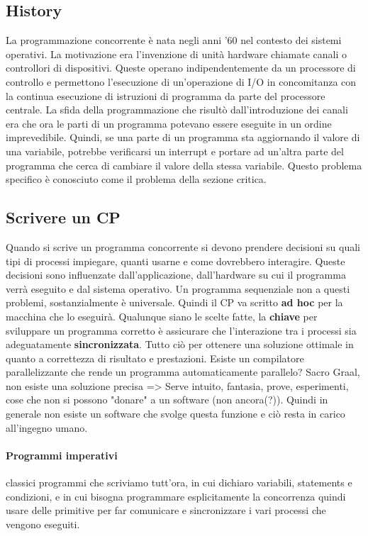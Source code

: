 \documentclass[10pt,a4paper]{book}
\begin{document}
\subsection{History}
La programmazione concorrente è nata negli anni '60 nel contesto dei sistemi operativi. La motivazione era l'invenzione di unità hardware chiamate canali o controllori di dispositivi. Queste operano indipendentemente da un processore di controllo e permettono l'esecuzione di un'operazione di I/O in concomitanza con la continua esecuzione di istruzioni di programma da parte del processore centrale.
La sfida della programmazione che risultò dall'introduzione dei canali era che ora le parti di un programma potevano essere eseguite in un ordine imprevedibile. Quindi, se una parte di un programma sta aggiornando il valore di una variabile, potrebbe verificarsi un interrupt e portare ad un'altra parte del programma che cerca di cambiare il valore della stessa variabile. Questo problema specifico è conosciuto come il problema della sezione critica.

\subsection{Scrivere un CP}
Quando si scrive un programma concorrente si devono prendere decisioni su quali tipi di processi impiegare, quanti usarne e come dovrebbero interagire. Queste decisioni sono influenzate dall'applicazione, dall'hardware su cui il programma verrà eseguito e dal sistema operativo. Un programma sequenziale non a questi problemi, sostanzialmente è universale. Quindi il CP va scritto \textbf{ad hoc} per la macchina che lo eseguirà.
Qualunque siano le scelte fatte, la \textbf{chiave} per sviluppare un programma corretto è assicurare che l'interazione tra i processi sia adeguatamente \textbf{sincronizzata}. Tutto ciò per ottenere una soluzione ottimale in quanto a correttezza di risultato e prestazioni.
Esiste un compilatore parallelizzante che rende un programma automaticamente parallelo? Sacro Graal, non esiste una soluzione precisa => Serve intuito, fantasia, prove, esperimenti, cose che non si possono "donare" a un software (non ancora(?)). Quindi in generale non esiste un software che svolge questa funzione e ciò resta in carico all'ingegno umano.

\paragraph{Programmi imperativi}
classici programmi che scriviamo tutt'ora, in cui dichiaro variabili, statements e condizioni, e in cui bisogna programmare esplicitamente la concorrenza quindi usare delle primitive per far comunicare e sincronizzare i vari processi che vengono eseguiti.
\end{document}
